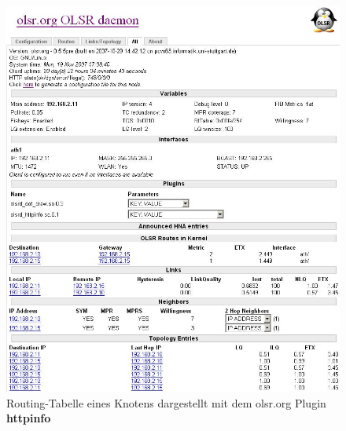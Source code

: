 \begin{figure}[H]
\centering
\includegraphics[width=1.0\textwidth]{images/Olsr_Route.jpg}
\caption{Routing-Tabelle eines Knotens dargestellt
	mit dem olsr.org Plugin \textbf{httpinfo}}
\label{fig:httpinfo}
\end{figure}
